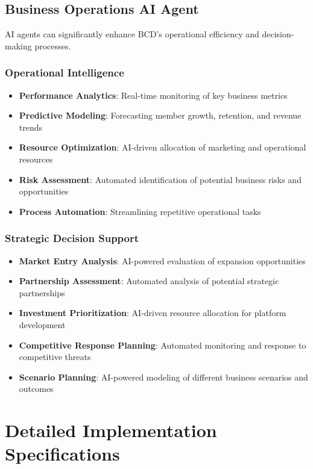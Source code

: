 \subsection{Business Operations AI Agent}
AI agents can significantly enhance BCD's operational efficiency and decision-making processes.

\subsubsection{Operational Intelligence}
\begin{itemize}
    \item \textbf{Performance Analytics}: Real-time monitoring of key business metrics
    \item \textbf{Predictive Modeling}: Forecasting member growth, retention, and revenue trends
    \item \textbf{Resource Optimization}: AI-driven allocation of marketing and operational resources
    \item \textbf{Risk Assessment}: Automated identification of potential business risks and opportunities
    \item \textbf{Process Automation}: Streamlining repetitive operational tasks
\end{itemize}

\subsubsection{Strategic Decision Support}
\begin{itemize}
    \item \textbf{Market Entry Analysis}: AI-powered evaluation of expansion opportunities
    \item \textbf{Partnership Assessment}: Automated analysis of potential strategic partnerships
    \item \textbf{Investment Prioritization}: AI-driven resource allocation for platform development
    \item \textbf{Competitive Response Planning}: Automated monitoring and response to competitive threats
    \item \textbf{Scenario Planning}: AI-powered modeling of different business scenarios and outcomes
\end{itemize}

\section{Detailed Implementation Specifications}

